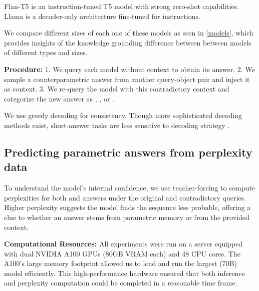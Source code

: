 Flan-T5 \citep{flant5} is an instruction-tuned T5 model \citep{t5} with strong zero-shot capabilities.
Llama \citep{llama3} is a decoder-only architecture fine-tuned for instructions.

We compare different sizes of each one of these models as seen in \cref{models}, which provides insights of the knowledge grounding difference between between models of different types and sizes.

\textbf{Procedure:}
1. We query each model without context to obtain its \Parametric{} answer.
2. We sample a counterparametric answer from another query-object pair and inject it as context.
3. We re-query the model with this contradictory context and categorize the new answer as \Parametric{}, \Contextual{}, or \Other{}.

We use greedy decoding for consistency.
Though more sophisticated decoding methods exist, short-answer tasks are less sensitive to decoding strategy \citep{t5}.

\subsection{Predicting parametric answers from perplexity data}
To understand the model’s internal confidence, we use teacher-forcing to compute perplexities for both \Parametric{} and \Contextual{} answers under the original and contradictory queries.
Higher perplexity suggests the model finds the sequence less probable, offering a clue to whether an answer stems from parametric memory or from the provided context.

\textbf{Computational Resources:}
All experiments were run on a server equipped with dual NVIDIA A100 GPUs (80GB VRAM each) and 48 CPU cores.
The A100’s large memory footprint allowed us to load and run the largest (70B) model efficiently.
This high-performance hardware ensured that both inference and perplexity computation could be completed in a reasonable time frame.

